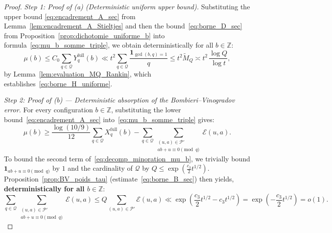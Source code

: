 \documentclass[11pt, a4paper]{article}
\theoremstyle{plain}
\theoremstyle{definition}
\newcommand{\Z}{\mathbb{Z}}
\newcommand{\ind}{\mathbf{1}}
\begin{document}
\begin{proof}
\emph{Step 1: Proof of (a) (Deterministic uniform upper bound).} Substituting the upper bound \eqref{eq:encadrement_A_sec} from Lemma~\ref{lem:encadrement_A_Stieltjes} and then the bound~\eqref{eq:borne_D_sec} from Proposition~\ref{prop:dichotomie_uniforme_b} into formula~\eqref{eq:mu_b_somme_triple}, we obtain deterministically for all $b \in \Z$:
\[
\mu(b) \le C_0 \sum_{q \in \mathcal{Q}} Y_q^{\mathrm{full}}(b) \ll t^2 \sum_{q \in \mathcal{Q}} \frac{\ind_{\gcd(b,q)=1}}{q} \le t^2 \widetilde{M}_Q \asymp t^2\,\frac{\log Q}{\log t},
\]
by Lemma~\ref{lem:evaluation_MQ_Rankin}, which establishes~\eqref{eq:borne_H_uniforme}.

\medskip\noindent
\emph{Step 2: Proof of (b) --- Deterministic absorption of the Bombieri--Vinogradov error.} For every configuration $b \in \Z$, substituting the lower bound~\eqref{eq:encadrement_A_sec} into~\eqref{eq:mu_b_somme_triple} gives:
\begin{equation}\label{eq:decomp_minoration_mu_b}
\mu(b) \ge \frac{\log(10/9)}{12} \sum_{q \in \mathcal{Q}} X_q^{\mathrm{full}}(b) - \sum_{q \in \mathcal{Q}} \sum_{\substack{(u,a) \in \mathcal{P}' \\ ab+u \equiv 0 \pmod q}} \mathcal{E}(u,a).
\end{equation}
To bound the second term of~\eqref{eq:decomp_minoration_mu_b}, we trivially bound $\ind_{ab+u \equiv 0 \pmod q}$ by $1$ and the cardinality of $\mathcal{Q}$ by $Q \le \exp(\frac{c_3}{2} t^{1/2})$. Proposition~\ref{prop:BV_poids_tau} (estimate~\eqref{eq:borne_B_sec}) then yields, \textbf{deterministically for all $b \in \Z$}:
\begin{equation}\label{eq:absorption_BV_Q}
\sum_{q \in \mathcal{Q}} \sum_{\substack{(u,a) \in \mathcal{P}' \\ ab+u \equiv 0 \pmod q}} \mathcal{E}(u,a) \le Q \sum_{(u,a) \in \mathcal{P}'} \mathcal{E}(u,a) \ll \exp\!\left(\frac{c_3}{2} t^{1/2} - c_3 t^{1/2}\right) = \exp\!\left(-\frac{c_3}{2} t^{1/2}\right) = o(1).
\end{equation}


\end{proof}
\end{document}
